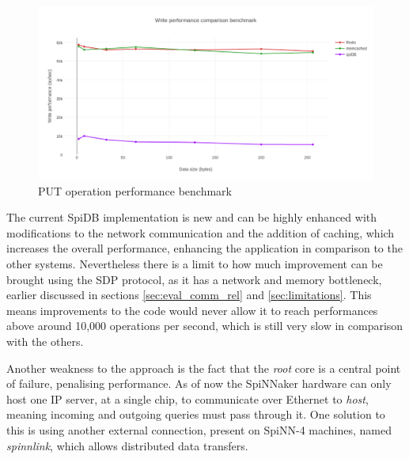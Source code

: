 \begin{figure}
\begin{center}
	\includegraphics[width=1.4\textwidth, natwidth=1063, natheight=509]{images/write_performance.png}
\end{center}
\caption{PUT operation performance benchmark}
\label{fig:write-perf-benchmark}
\end{figure}

The current SpiDB implementation is new and can be highly enhanced with modifications to the network communication and the addition of caching, which increases the overall performance, enhancing the application in comparison to the other systems. Nevertheless there is a limit to how much improvement can be brought using the SDP protocol, as it has a network and memory bottleneck, earlier discussed in sections \ref{sec:eval_comm_rel} and \ref{sec:limitations}. This means improvements to the code would never allow it to reach performances above around 10,000 operations per second, which is still very slow in comparison with the others.

Another weakness to the approach is the fact that the \textit{root} core is a central point of failure, penalising performance. As of now the SpiNNaker hardware can only host one IP server, at a single chip, to communicate over Ethernet to \textit{host}, meaning incoming and outgoing queries must pass through it. One solution to this is using another external connection, present on SpiNN-4 machines, named \textit{spinnlink}, which allows distributed data transfers.

